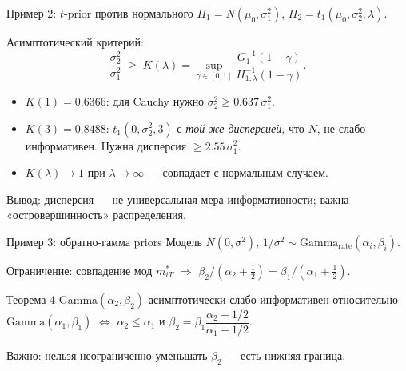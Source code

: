 \documentclass[aspectratio=169,10pt]{beamer}
\begin{document}
\begin{frame}{Пример 2: $t$-prior против нормального}
  $\Pi_1 = N(\mu_0,\sigma_1^2)$, $\Pi_2 = t_1(\mu_0,\sigma_2^2,\lambda)$.

  Асимптотический критерий:
  \[
    \frac{\sigma_2^2}{\sigma_1^2}
      \;\ge\;
      K(\lambda)
      = \sup_{\gamma\in[0,1]}
        \frac{G_1^{-1}(1-\gamma)}{H_{1,\lambda}^{-1}(1-\gamma)}.
  \]

  \begin{itemize}
    \item $K(1)=0.6366$: для Cauchy нужно $\sigma_2^2\ge 0.637\,\sigma_1^2$.
    \item $K(3)=0.8488$: $t_1(0,\sigma_2^2,3)$ с \emph{той же дисперсией}, что $N$,
          \alert{не} слабо информативен.
      Нужна дисперсия $\ge 2.55\,\sigma_1^2$.
    \item $K(\lambda)\to 1$ при $\lambda\to\infty$ — совпадает с нормальным случаем.
  \end{itemize}

  \alert{Вывод:} дисперсия — не универсальная мера информативности;
  важна «островершинность» распределения.
\end{frame}

\begin{frame}{Пример 3: обратно-гамма priors}
  Модель $N(0,\sigma^2)$, $1/\sigma^2\sim\mathrm{Gamma}_{\mathrm{rate}}(\alpha_i,\beta_i)$.

  Ограничение: совпадение мод $m_{iT}^*$ $\Rightarrow$
  $\beta_2/(\alpha_2+\tfrac12)=\beta_1/(\alpha_1+\tfrac12)$.

  \begin{block}{Теорема 4}
    $\mathrm{Gamma}(\alpha_2,\beta_2)$ асимптотически слабо информативен
    относительно $\mathrm{Gamma}(\alpha_1,\beta_1)$
    $\iff$
    $\alpha_2\le\alpha_1$ и
    $\beta_2 = \beta_1\dfrac{\alpha_2+1/2}{\alpha_1+1/2}$.
  \end{block}

  \alert{Важно:} нельзя неограниченно уменьшать $\beta_2$ — есть нижняя граница.
\end{frame}
\end{document}

